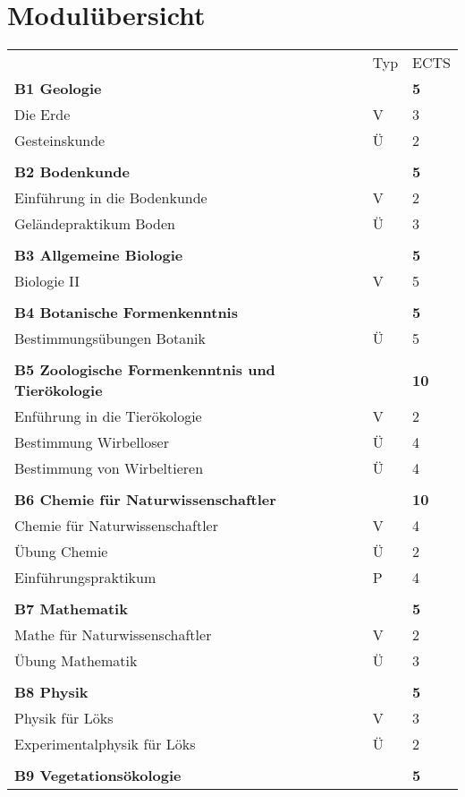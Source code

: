 \section{Modulübersicht}
\begin{longtable}{p{} p{} p{}}
 & Typ & ECTS \\ 
\textbf{B1 Geologie} & & \textbf{5}\\ 
Die Erde & V & 3\\
Gesteinskunde & Ü & 2\\
& &\\
\textbf{B2 Bodenkunde}& & \textbf{5}\\
Einführung in die Bodenkunde & V & 2\\
Geländepraktikum Boden & Ü & 3\\
& &\\
\textbf{B3 Allgemeine Biologie}& & \textbf{5}\\
Biologie II & V &5\\
& &\\
\textbf{B4 Botanische Formenkenntnis} & & \textbf{5}\\
Bestimmungsübungen Botanik & Ü & 5\\
& &\\
\textbf{B5 Zoologische Formenkenntnis und Tierökologie} & &\textbf{10}\\
Enführung in die Tierökologie & V & 2\\
Bestimmung Wirbelloser & Ü & 4\\
Bestimmung von Wirbeltieren & Ü & 4\\
& &\\
\textbf{B6 Chemie für Naturwissenschaftler} & & \textbf{10}\\
Chemie für Naturwissenschaftler & V & 4\\
Übung Chemie & Ü & 2\\
Einführungspraktikum & P & 4 \\
&&\\
\textbf{B7 Mathematik} & &\textbf{5}\\
Mathe für Naturwissenschaftler & V & 2\\
Übung Mathematik & Ü & 3\\
&&\\
\textbf{B8 Physik} & & \textbf{5}\\
Physik für Löks & V & 3 \\
Experimentalphysik für Löks & Ü & 2\\
&&\\
\textbf{B9 Vegetationsökologie} & & \textbf{5}\\

\end{longtable}
